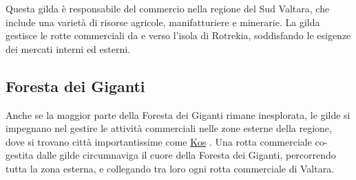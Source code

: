Questa gilda è responsabile del commercio nella regione del Sud Valtara,
che include una varietà di risorse agricole, manifatturiere e minerarie.
La gilda gestisce le rotte commerciali da e verso l'isola di Rotrekia,
soddisfando le esigenze dei mercati interni ed esterni.

\subsection{Foresta dei Giganti}\label{foresta-dei-giganti}

Anche se la maggior parte della Foresta dei Giganti rimane inesplorata,
le gilde si impegnano nel gestire le attività commerciali nelle zone
esterne della regione, dove si trovano città importantissime come
\href{Kos\%20bb2884f1df2e4e47890b8cefddb5e4bd.md}{Kos} . Una rotta
commerciale co-gestita dalle gilde circumnaviga il cuore della Foresta
dei Giganti, percorrendo tutta la zona esterna, e collegando tra loro
ogni rotta commerciale di Valtara.
